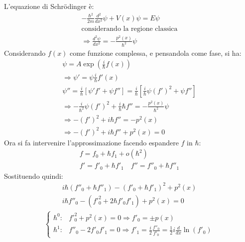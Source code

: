 L'equazione di Schrödinger è:
\begin{equation}\begin{split}
-\frac{\hbar ^2}{2m}\frac{d^2}{dx^2}\psi +V\left(x\right)\psi =E\psi \\
\textrm{considerando la regione classica}\\
\Longrightarrow \frac{d^2\psi }{dx^2}=-\frac{p^2\left(x\right)}{\hbar ^2}\psi 
\end{split}\end{equation}
Considerando $f\left(x\right)$ come funzione complessa, e pensandola come fase, si ha:
\begin{equation}\begin{split}
\psi =A\exp{\left(\frac{i}{\hbar }f\left(x\right)\right)}\\
\Longrightarrow \psi '=\psi \frac{i}{\hbar }f'\left(x\right)\\
\psi ''=\frac{i}{\hbar }\left[\psi 'f'+\psi f''\right]=\frac{i}{\hbar }\left[\frac{i}{\hbar }\psi \left(f'\right)^2+\psi f''\right]\\
\Longrightarrow -\frac{i}{\hbar ^2}\psi \left(f'\right)^2+\frac{i}{\hbar }\hbar f''=-\frac{p^2\left(x\right)}{\hbar ^2}\psi \\
\Longrightarrow -\left(f'\right)^2+i\hbar f''=-p^2\left(x\right)\\
\Longrightarrow -\left(f'\right)^2+i\hbar f''+p^2\left(x\right)=0
\end{split}\end{equation}
Ora si fa intervenire l'approssimazione facendo espandere $f$ in $\hbar $:
\begin{equation}\begin{split}
f=f_0+\hbar f_1+o\left(\hbar ^2\right)\\
f'=f'_0+\hbar f'_1 \quad f''=f''_0+\hbar f''_1
\end{split}\end{equation}
Sostituendo quindi:
\begin{equation}\begin{split}
i\hbar \left(f''_0+\hbar f''_1\right)-\left(f'_0+\hbar f'_1\right)^2+p^2\left(x\right)\\
i\hbar f''_0-\left(f'^2_0+2\hbar f'_0f'_1\right)+p^2\left(x\right)=0
\end{split}\end{equation}
\begin{equation}\begin{split}
\begin{cases}
\hbar ^0: & f{'}_0^2+p^2\left(x\right)=0 \Longrightarrow f{'}_0=\pm p\left(x\right)\\
\hbar ^1: & f''_0-2f'_0f'_1=0 \Longrightarrow f'_1=\frac{i}{2}\frac{f''_0}{f'_0}=\frac{1}{2}i\frac{d}{dx}\ln{\left(f'_0\right)}
\end{cases}
\end{split}\end{equation}

